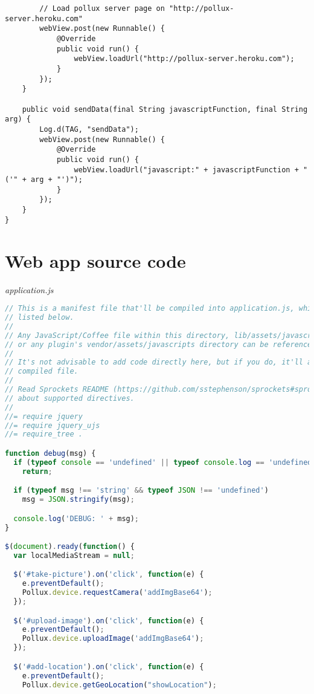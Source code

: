 \begin{appendices}
\begin{lstlisting}
        // Load pollux server page on "http://pollux-server.heroku.com"
        webView.post(new Runnable() {
            @Override
            public void run() {
                webView.loadUrl("http://pollux-server.heroku.com");
            }
        });
    }

    public void sendData(final String javascriptFunction, final String arg) {
        Log.d(TAG, "sendData");
        webView.post(new Runnable() {
            @Override
            public void run() {
                webView.loadUrl("javascript:" + javascriptFunction + "('" + arg + "')");
            }
        });
    }
}
\end{lstlisting}

\section{Web app source code}  \label{app:web-app-source-code-android}
\emph{application.js}
\begin{lstlisting}[language=JavaScript]
// This is a manifest file that'll be compiled into application.js, which will include all the files
// listed below.
//
// Any JavaScript/Coffee file within this directory, lib/assets/javascripts, vendor/assets/javascripts,
// or any plugin's vendor/assets/javascripts directory can be referenced here using a relative path.
//
// It's not advisable to add code directly here, but if you do, it'll appear at the bottom of the
// compiled file.
//
// Read Sprockets README (https://github.com/sstephenson/sprockets#sprockets-directives) for details
// about supported directives.
//
//= require jquery
//= require jquery_ujs
//= require_tree .

function debug(msg) {
  if (typeof console == 'undefined' || typeof console.log == 'undefined')
    return;

  if (typeof msg !== 'string' && typeof JSON !== 'undefined')
    msg = JSON.stringify(msg);

  console.log('DEBUG: ' + msg);
}

$(document).ready(function() {
  var localMediaStream = null;

  $('#take-picture').on('click', function(e) {
    e.preventDefault();
    Pollux.device.requestCamera('addImgBase64');
  });

  $('#upload-image').on('click', function(e) {
    e.preventDefault();
    Pollux.device.uploadImage('addImgBase64');
  });

  $('#add-location').on('click', function(e) {
    e.preventDefault();
    Pollux.device.getGeoLocation("showLocation");


\end{lstlisting}
\end{appendices}
